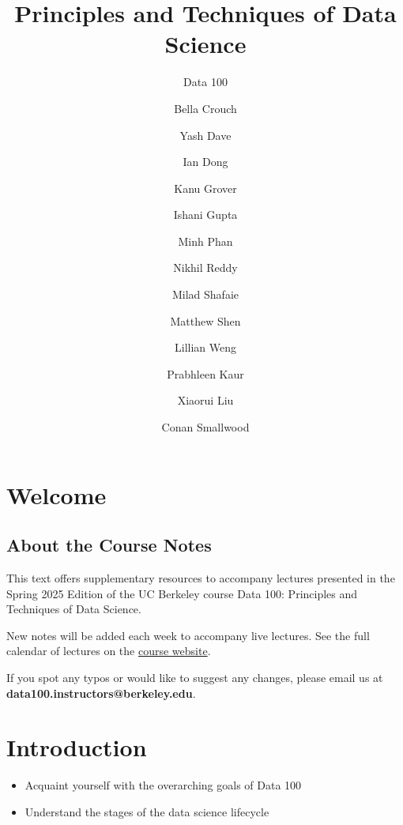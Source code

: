 \documentclass[
  letterpaper,
  DIV=11,
  numbers=noendperiod]{scrreprt}
\title{Principles and Techniques of Data Science}
\subtitle{Data 100}
\author{Bella Crouch \and Yash Dave \and Ian Dong \and Kanu
Grover \and Ishani Gupta \and Minh Phan \and Nikhil Reddy \and Milad
Shafaie \and Matthew Shen \and Lillian Weng \and Prabhleen
Kaur \and Xiaorui Liu \and Conan Smallwood}
\date{}
\providecommand{\tightlist}{%
  \setlength{\itemsep}{0pt}\setlength{\parskip}{0pt}}\usepackage{longtable,booktabs,array}
\renewcommand*\contentsname{Table of contents}
\newcommand\contentsname{Table of contents}
\begin{document}
\maketitle

\renewcommand*\contentsname{Table of contents}
{
\hypersetup{linkcolor=}
\setcounter{tocdepth}{2}
\tableofcontents
}


\chapter*{Welcome}\label{welcome}


\section*{About the Course Notes}\label{about-the-course-notes}


This text offers supplementary resources to accompany lectures presented
in the Spring 2025 Edition of the UC Berkeley course Data 100:
Principles and Techniques of Data Science.

New notes will be added each week to accompany live lectures. See the
full calendar of lectures on the \href{https://ds100.org/sp25/}{course
website}.

If you spot any typos or would like to suggest any changes, please email
us at \textbf{data100.instructors@berkeley.edu}.


\chapter{Introduction}\label{introduction}

\begin{tcolorbox}[enhanced jigsaw, titlerule=0mm, bottomtitle=1mm, arc=.35mm, colframe=quarto-callout-note-color-frame, rightrule=.15mm, opacityback=0, opacitybacktitle=0.6, leftrule=.75mm, breakable, toprule=.15mm, colback=white, left=2mm, colbacktitle=quarto-callout-note-color!10!white, toptitle=1mm, bottomrule=.15mm, title=\textcolor{quarto-callout-note-color}{\faInfo}\hspace{0.5em}{Learning Outcomes}, coltitle=black]

\begin{itemize}
\tightlist
\item
  Acquaint yourself with the overarching goals of Data 100
\item
  Understand the stages of the data science lifecycle
\end{itemize}

\end{tcolorbox}
\end{document}
